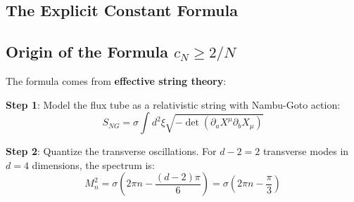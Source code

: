 \subsection{The Explicit Constant Formula}

\begin{center}
\end{center}

\subsection{Origin of the Formula \texorpdfstring{$c_N \geq 2/N$}{cN >= 2/N}}

The formula comes from \textbf{effective string theory}:

\textbf{Step 1}: Model the flux tube as a relativistic string with 
Nambu-Goto action:
\begin{equation}
S_{NG} = \sigma \int d^2\xi \sqrt{-\det(\partial_a X^\mu \partial_b X_\mu)}
\end{equation}

\textbf{Step 2}: Quantize the transverse oscillations. For $d-2 = 2$ 
transverse modes in $d=4$ dimensions, the spectrum is:
\begin{equation}
M_n^2 = \sigma \left( 2\pi n - \frac{(d-2)\pi}{6} \right) = \sigma \left( 2\pi n - \frac{\pi}{3} \right)
\end{equation}

